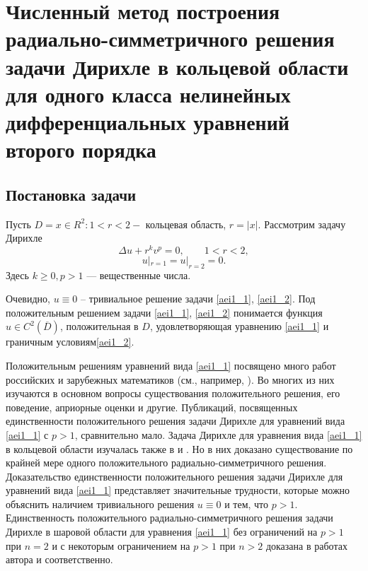 


\chapter{ Численный метод построения  радиально-симметричного
 решения задачи Дирихле  в кольцевой области для  одного класса нелинейных
  дифференциальных уравнений  второго порядка}
















\section{Постановка задачи}

           Пусть $ D={x\in R^2: 1<r<2}-$  кольцевая область,
$ r=|x| $.    Рассмотрим задачу Дирихле
\begin{equation}\label{aei1_1}
\Delta u+r^kv^p=0, \qquad 1<r<2,
\end{equation}
\begin{equation}\label{aei1_2}
u|_{r=1}=u|_{r=2}=0.
\end{equation}
Здесь $ k \geq 0, p>1$ --- вещественные числа.

Очевидно, $ u \equiv 0$ -- тривиальное решение задачи \eqref{aei1_1}, \eqref{aei1_2}. Под
положительным решением задачи \eqref{aei1_1}, \eqref{aei1_2} понимается функция $ u \in
C^2(\overline {D})$, положительная в $D$, удовлетворяющая
уравнению \eqref{aei1_1} и граничным условиям\eqref{aei1_2}.

Положительным решениям уравнений вида \eqref{aei1_1} посвящено много
работ российских и зарубежных математиков
(см., например, \cite{aeiL_1, aeiL_2, aeiL_3, aeiL_4, aeiL_5, aeiL_6, aeiL_7, aeiL_8, aeiL_9, aeiL_10, aeiL_11, aeiL_12}).
Во многих из них изучаются в основном
вопросы существования положительного решения, его поведение,
априорные оценки и другие. Публикаций, посвященных
единственности положительного решения задачи Дирихле
для уравнений вида \eqref{aei1_1} с $ p>1$, сравнительно мало.
Задача Дирихле для уравнения вида \eqref{aei1_1} в кольцевой области
изучалась также в \cite{aeiL_1} и \cite{aeiL_11}. Но в них доказано существование
по крайней мере одного положительного радиально-симметричного
решения. Доказательство единственности положительного решения
 задачи Дирихле для уравнений вида \eqref{aei1_1} представляет
значительные трудности, которые можно объяснить наличием
тривиального решения $ u \equiv 0 $  и тем, что $ p>1 $.
Единственность положительного радиально-симметричного решения
задачи Дирихле в шаровой области для  уравнения \eqref{aei1_1}  без
ограничений на $ p>1 $ при $ n=2 $  и с некоторым
ограничением на $ p>1 $  при $ n>2 $  доказана в работах
автора \cite{aeiL_12} и  \cite{aeiL_13} соответственно.

